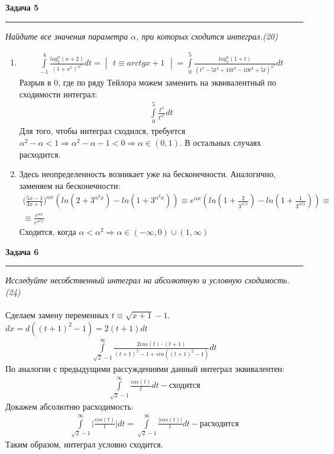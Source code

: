 \documentclass[a4paper,11pt]{article}
\begin{document}
\textbf{\large Задача 5}
\medskip\hrule\medskip
\textit{Найдите все значения параметра $ \alpha $, при которых сходится интеграл.(20)}
\begin{enumerate}
	\item  \begin{gather*}
	\int\limits_{-1}^{4} \frac{log_2^{\alpha}(x + 2)}{(1 + x^5)^{\alpha^2}}dt = 
	\begin{vmatrix} t \equiv arctg x + 1 \end{vmatrix} = 
	\int\limits_{0}^{5} \frac{log_2^{\alpha}(1 + t)}{(t^5 - 5 t^4 + 10 t^3 - 10 t^2 + 5 t)^{\alpha^2}}dt 
	\end{gather*}
	Разрыв в 0, где по ряду Тейлора можем заменить на эквивалентный по сходимости интеграл:
	\begin{gather*}
	\int\limits_{0}^{5} \frac{t^{\alpha}}{t^{\alpha^2}}dt
	\end{gather*}
	Для того, чтобы интеграл сходился, требуется $ \alpha^2 - \alpha < 1 \Rightarrow \alpha^2 - \alpha - 1 < 0 \Rightarrow \alpha \in (0, 1) $. В остальных случаях расходится.
	
	
	\item Здесь неопределенность возникает уже на бесконечности.  Аналогично, заменяем на бесконечности:
	\begin{gather*}
	\Big(\frac{5x - 1}{3x + 1}\Big)^{\alpha x} (ln(2 + 3^{\alpha^2x}) - ln(1 + 3^{\alpha^2x})) \equiv e^{\alpha x}  (ln(1 + \frac2{3^{\alpha^2x}}) - ln(1 + \frac1{3^{\alpha^2x}})) \equiv \\[2pt] \equiv
	\frac{e^{\alpha x}}{e^{\alpha^2 x}}
	\end{gather*}
	Сходится, когда $ \alpha < \alpha^2 \Rightarrow \alpha \in (-\infty, 0) \cup (1, \infty) $ 
\end{enumerate}
\newpage






\textbf{\large Задача 6}
\medskip\hrule\medskip
\textit{Исследуйте несобственный интеграл на абсолютную и условную сходимость.(24)} \\ \\
Сделаем замену переменных $ t \equiv \sqrt{x + 1} - 1 $. $ dx = d((t + 1)^2 - 1) = 2(t + 1)dt $
\begin{gather*}
\int\limits_{\sqrt{2} - 1}^{\infty} \frac{2cos(t) \cdot (t + 1)}{(t + 1)^2 - 1 + sin((t + 1)^2 - 1)}dt
\end{gather*}
По аналогии с предыдущими рассуждениями данный интеграл эквивалентен:
\begin{gather*}
\int\limits_{\sqrt{2} - 1}^{\infty} \frac{cos(t)}{t}dt - \text{сходится}
\end{gather*}
Докажем абсолютню расходимость:
\begin{gather*}
\int\limits_{\sqrt{2} - 1}^{\infty} \Big|\frac{cos(t)}{t}\Big|dt = 
\int\limits_{\sqrt{2} - 1}^{\infty} \frac{|cos(t)|}{t}dt - \text{расходится}
\end{gather*}
Таким образом, интеграл условно сходится.
\\ \\ \\
\end{document}
